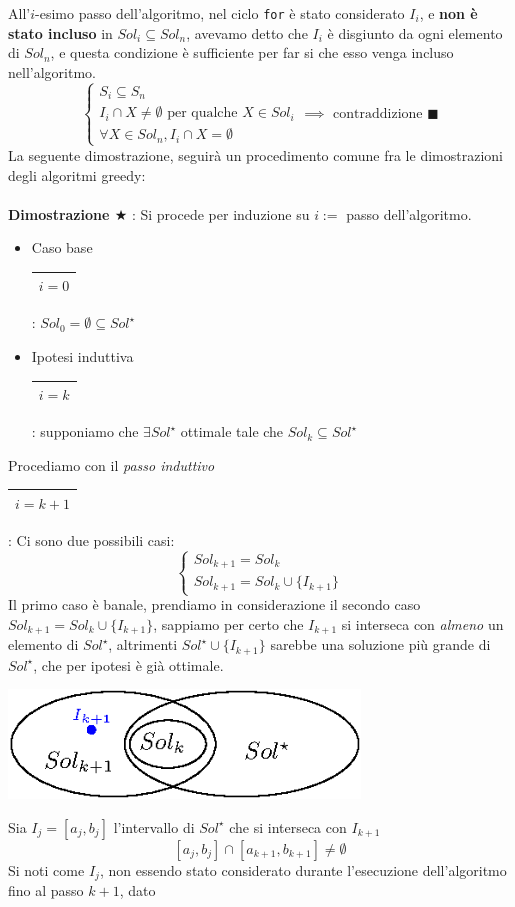 \documentclass[12pt, letterpaper]{article}
\newcommand{\code}[1]{\colorbox{light-gray}{\texttt{#1}}}
\newcommand{\acc}{\\\hphantom{}\\}
\newcommand{\boxedMath}[1]{\begin{tabular}{|c|}\hline \texttt{#1} \\ \hline\end{tabular} :}
\begin{document}
All'$i$-esimo passo dell'algoritmo, nel ciclo \code{for} è stato considerato $I_i$, e \textbf{non è stato incluso} in
$Sol_i\subseteq Sol_n$, avevamo detto che $I_i$ è disgiunto da ogni elemento di $Sol_n$, e questa condizione è sufficiente
per far si che esso venga incluso nell'algoritmo.
$$ \begin{cases}
        S_i\subseteq S_n                                       \\
        I_i\cap X \ne \emptyset \text{ per qualche }X\in Sol_i \\
        \forall X\in Sol_n, I_i\cap X = \emptyset
    \end{cases}\implies \text{ contraddizione }\blacksquare$$
La seguente dimostrazione, seguirà un procedimento comune fra le dimostrazioni degli algoritmi greedy:\acc
\textbf{Dimostrazione $\bigstar$} : Si procede per induzione su $i :=$ passo dell'algoritmo.\begin{itemize}
    \item Caso base \boxedMath{$i=0$} $Sol_0 = \emptyset \subseteq Sol^\star$
    \item Ipotesi induttiva  \boxedMath{$i=k$} supponiamo che $\exists Sol^\star$ ottimale tale che $Sol_k\subseteq Sol^\star$
\end{itemize}
Procediamo con il \textit{passo induttivo} \boxedMath{$i=k+1$} Ci sono due possibili casi:
$$\begin{cases}
        Sol_{k+1}=Sol_k \\
        Sol_{k+1}=Sol_k \cup \{I_{k+1}\}
    \end{cases}$$
Il primo caso è banale, prendiamo in considerazione il secondo caso $Sol_{k+1}=Sol_k \cup \{I_{k+1}\}$, sappiamo per certo che
$I_{k+1}$ si interseca con \textit{almeno} un elemento di $Sol^\star$, altrimenti $Sol^\star\cup \{I_{k+1}\}$ sarebbe una
soluzione più grande di $Sol^\star$, che per ipotesi è già ottimale.\begin{center}
    \includegraphics[width=0.7\textwidth ]{images/dimPropIntervalli.eps}
\end{center}
Sia $I_j=[a_j,b_j]$ l'intervallo di $Sol^\star$ che si interseca con $I_{k+1}$
$$ [a_j,b_j]\cap [a_{k+1},b_{k+1}]\ne \emptyset$$
Si noti come $I_j$, non essendo stato considerato durante l'esecuzione dell'algoritmo fino al passo $k+1$, dato
\end{document}
